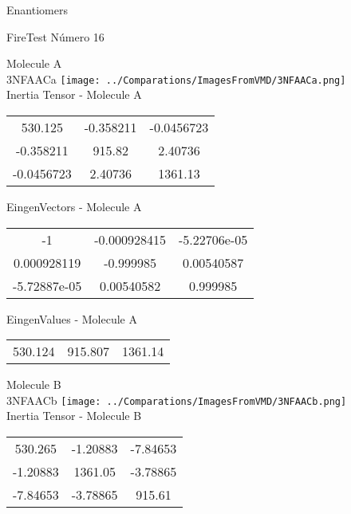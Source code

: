 \begin{center}
\vtab
\vtab
\textcolor{NavyBlue}{\Large Enantiomers}
\end{center}

 \newpage

\vtab[-2cm]
\begin{center}
{\large FireTest \tab Número 16}
\end{center}
\begin{multicols}{2}
\begin{center}

Molecule A \\ 
3NFAACa
\texttt{[image: ../Comparations/ImagesFromVMD/3NFAACa.png]}
\\
Inertia Tensor - Molecule A \\
\vtab

\begin{tabular}{|c c c|}
530.125	 & 	-0.358211	 & 	-0.0456723	 \\
-0.358211	 & 	915.82	 & 	2.40736	 \\
-0.0456723	 & 	2.40736	 & 	1361.13
\end{tabular}

\vtab
 EingenVectors - Molecule A     \\
\vtab
\begin{tabular}{|c c c|}
-1	 & 	-0.000928415	 & 	-5.22706e-05	 \\
0.000928119	 & 	-0.999985	 & 	0.00540587	 \\
-5.72887e-05	 & 	0.00540582	 & 	0.999985
\end{tabular}

\vtab
 EingenValues - Molecule A     \\
\vtab
\begin{tabular}{|c c c|}
530.124	 & 	915.807	 & 	1361.14	 \\
\end{tabular}
\columnbreak

Molecule B \\ 
3NFAACb
\texttt{[image: ../Comparations/ImagesFromVMD/3NFAACb.png]}
\\
Inertia Tensor - Molecule B \\
\vtab

\begin{tabular}{|c c c|}
530.265	 & 	-1.20883	 & 	-7.84653	 \\
-1.20883	 & 	1361.05	 & 	-3.78865	 \\
-7.84653	 & 	-3.78865	 & 	915.61
\end{tabular}


\end{center}
\end{multicols}
